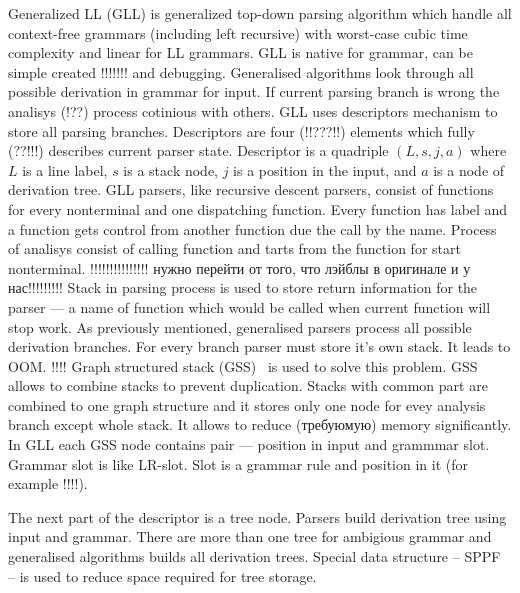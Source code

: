 Generalized LL (GLL) is generalized top-down parsing algorithm which handle all context-free grammars (including left recursive) with worst-case cubic time complexity and linear for LL grammars.
GLL is native for grammar, can be simple created !!!!!!! and debugging. Generalised algorithms look through all possible derivation in grammar for input. If current parsing branch is wrong the analisys (!??) process cotinious with others. 
GLL uses descriptors mechanism to store all parsing branches. Descriptors are four (!!???!!) elements which fully (??!!!) describes current parser state. Descriptor is a quadriple $(L, s, j, a)$ where $L$ is a line label, $s$ is a stack node, $j$ is a position in the input, and $a$ is a node of derivation tree. GLL parsers, like recursive descent parsers, consist of functions for every nonterminal and one dispatching function. Every function has label and a function gets control from another function due the call by the name. Process of analisys consist of calling function and tarts from the function for start nonterminal. !!!!!!!!!!!!!!!  нужно перейти от того, что лэйблы в оригинале и у нас!!!!!!!!!
Stack in parsing process is used to store return information for the parser --- a name of function which would be called when current function will stop work. As previously mentioned, generalised parsers process all possible derivation branches. For every branch parser must store it's own stack. It leads to OOM. !!!!  
Graph structured stack (GSS)~\cite{Tomita} is used to solve this problem. GSS allows to combine stacks to prevent duplication. Stacks with common part are combined to one graph structure and it stores only one node for evey analysis branch except whole stack. It allows to reduce (требуюмую) memory significantly. 
In GLL each GSS node contains pair --- position in input and grammmar slot. Grammar slot is like LR-slot. Slot is a grammar rule and position in it (for example !!!!).

The next part of the descriptor is a tree node. Parsers build derivation tree using input and grammar. There are more than one tree for ambigious grammar and generalised algorithms builds all derivation trees. Special data structure -- SPPF -- is used to reduce space required for tree storage.


